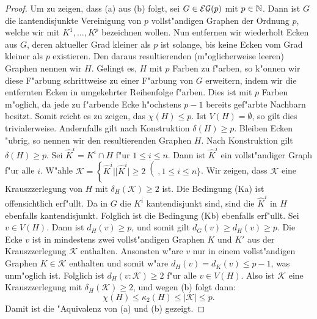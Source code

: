 \begin{proof}
  Um zu zeigen, dass (a) aus (b) folgt, sei $G\in {\cal EG}(p) $ mit $p\in {\mathbb{N}}$. Dann ist $G$ die kantendisjunkte Vereinigung von $p$ vollst"andigen Graphen der Ordnung $p$, welche wir mit $K^{1},\dots, K^{p}$ bezeichnen wollen. Nun entfernen wir wiederholt Ecken aus $G$,  deren aktueller Grad kleiner als $p$ ist solange, bis keine Ecken vom Grad kleiner als $p$ existieren. Den daraus resultierenden (m"oglicherweise leeren) Graphen nennen wir $H$. 
  Gelingt es, $H$ mit $p$ Farben zu f"arben, so k"onnen wir diese F"arbung schrittweise zu einer F"arbung von $G$ erweitern, indem wir die entfernten Ecken in umgekehrter Reihenfolge f"arben. Dies ist mit $p$ Farben m"oglich, da jede zu f"arbende Ecke h"ochstens $p-1$ bereits gef"arbte Nachbarn besitzt.
  Somit reicht es zu zeigen, das $\chi(H) \leq p$. Ist $V(H) =\emptyset$, so gilt dies trivialerweise. Andernfalls gilt nach Konstruktion $\delta(H) \geq p $. 
  Bleiben Ecken "ubrig, so nennen wir den resultierenden Graphen $H$. Nach Konstruktion gilt $\delta(H) \geq p$. Sei $\hat{K}^i = K^{i} \cap H$ f"ur $1\leq i \leq n$. Dann ist $\hat{K}^i$ ein vollst"andiger Graph f"ur alle $i$. W"ahle $\mathcal{K} = \left\{ \hat{K}^i | | \hat{K}^i| \geq 2  \right( , 1\leq i \leq n\}$. Wir zeigen, dass $\mathcal{K}$ eine Krauszzerlegung von $H$ mit $\delta_{H}(\mathcal{K}) \geq 2$ ist.
  Die Bedingung (Ka) ist offensichtlich erf"ullt. Da in $G$ die $K^{i}$ kantendisjunkt sind, sind die $\hat{K}^{i}$ in $H$ ebenfalls kantendisjunkt. Folglich ist die Bedingung (Kb) ebenfalls erf"ullt. Sei $v\in V(H)$. Dann ist $d_{H}(v) \geq p$, und somit gilt $d_{G}(v) \geq d_H(v) \geq p$. 
  Die Ecke $v$ ist in mindestens zwei vollst"andigen Graphen $K$ und $K'$ aus der Krauszzerlegung $\mathcal{K}$ enthalten. 
  Ansonsten w"are $v$ nur in einem vollst"andigen Graphen $K \in \mathcal{K}$ enthalten und somit w"are $d_{H}(v) = d_{K}(v) \leq p-1$, was unm"oglich ist. 
  Folglich ist $d_{H}(v:\mathcal{K}) \geq 2$ f"ur alle $v \in V(H)$. Also ist $\mathcal{K}$ eine Krauszzerlegung mit $\delta_{H}(\mathcal{K}) \geq 2$, und wegen (b) folgt dann:
  \begin{equation*}
    \chi(H) \leq \kappa_{2}(H) \leq |\mathcal{K}| \leq p .
  \end{equation*}
  Damit ist die "Aquivalenz von (a) und (b) gezeigt. 


\end{proof}
